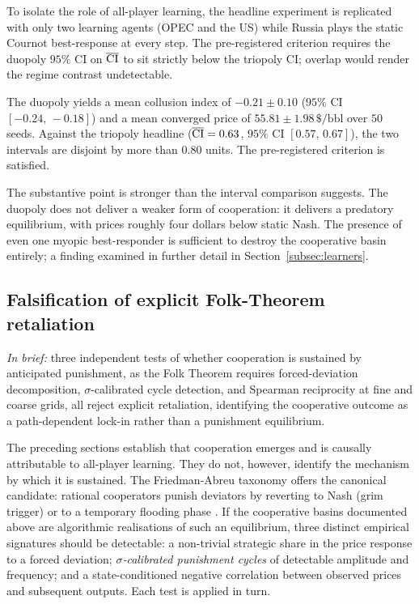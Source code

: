To isolate the role of all-player learning, the headline
experiment is replicated with only two learning agents (OPEC
and the US) while Russia plays the static Cournot best-response
at every step. The pre-registered criterion requires the duopoly
$95\%$ CI on $\overline{\mathrm{CI}}$ to sit strictly below the triopoly CI; overlap
would render the regime contrast undetectable.

The duopoly yields a mean collusion index of $-0.21 \pm 0.10$
($95\%$ CI $[-0.24,\,-0.18]$) and a mean converged price of
$55.81 \pm 1.98\,\$\text{/bbl}$ over $50$ seeds. Against the
triopoly headline ($\overline{\mathrm{CI}} = 0.63$, $95\%$ CI $[0.57,\,0.67]$), the
two intervals are disjoint by more than $0.80$ units. The
pre-registered criterion is satisfied.

The substantive point is stronger than the interval comparison
suggests. The duopoly does not deliver a weaker form of
cooperation: it delivers a predatory equilibrium, with
prices roughly four dollars below static Nash. The presence of
even one myopic best-responder is sufficient to destroy the
cooperative basin entirely; a finding examined in further detail
in Section~\ref{subsec:learners}.

\subsection{Falsification of explicit Folk-Theorem retaliation}
\label{subsec:falsification}

\emph{In brief:} three independent tests of whether cooperation is
sustained by anticipated punishment, as the Folk Theorem requires forced-deviation decomposition, $\sigma$-calibrated cycle detection, and
Spearman reciprocity at fine and coarse grids, all reject explicit
retaliation, identifying the cooperative outcome as a path-dependent
lock-in rather than a punishment equilibrium.

The preceding sections establish that cooperation emerges and is
causally attributable to all-player learning. They do not,
however, identify the mechanism by which it is sustained. The
Friedman-Abreu taxonomy offers the canonical candidate: rational
cooperators punish deviators by reverting to Nash (grim trigger)
or to a temporary flooding phase \citep{abreu1986}. If the
cooperative basins documented above are algorithmic realisations
of such an equilibrium, three distinct empirical signatures should
be detectable: a non-trivial strategic share in the price
response to a forced deviation; \emph{$\sigma$-calibrated
punishment cycles} of detectable amplitude and frequency; and a
state-conditioned negative correlation between observed
prices and subsequent outputs. Each test is applied in turn.

